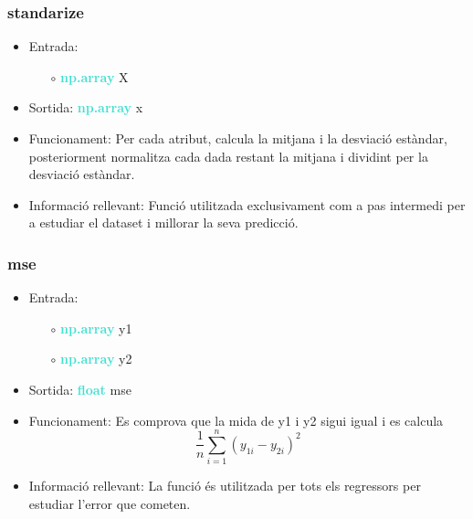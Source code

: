 \documentclass[a4paper, 11pt]{article}
\begin{document}
\subsubsection{standarize}
\begin{itemize}
    \item Entrada:
    \begin{itemize}
        \item [$\circ$] \textbf{\textcolor{Turquoise}{np.array}} X
    \end{itemize}
    \item Sortida: \textbf{\textcolor{Turquoise}{np.array}} x
    \item Funcionament: Per cada atribut, calcula la mitjana i la desviació estàndar, posteriorment normalitza cada dada restant la mitjana i dividint per la desviació estàndar.
    \item Informació rellevant: Funció utilitzada exclusivament com a pas intermedi per a estudiar el dataset i millorar la seva predicció. \label{standariza}
\end{itemize}

\subsubsection{mse}
\begin{itemize}
    \item Entrada:
    \begin{itemize}
        \item [$\circ$] \textbf{\textcolor{Turquoise}{np.array}} y1
        \item [$\circ$] \textbf{\textcolor{Turquoise}{np.array}} y2
    \end{itemize}
    \item Sortida: \textbf{\textcolor{Turquoise}{float}} mse
    \item Funcionament: Es comprova que la mida de y1 i y2 sigui igual i es calcula $$\frac{1}{n}\sum_{i=1}^{n} \left(y_{1i} - y_{2i}\right)^{2}$$
    \item Informació rellevant: La funció és utilitzada per tots els regressors per estudiar l'error que cometen. \label{mse}
\end{itemize}
\end{document}
